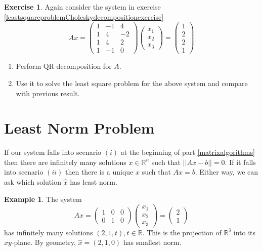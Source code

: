 \documentclass[12pt]{amsart}
\theoremstyle{definition}
\newtheorem{example}[theorem]{Example}
\newtheorem{exercise}[theorem]{Exercise}
\begin{document}
\begin{exercise}\label{} Again consider the system in exercise \ref{leastsquareproblemCholeskydecompositionexercise}
$$Ax = \left(\begin{array}{ccc} 1 & -1 & 4 \\ 1 & 4 & -2 \\ 1 & 4 & 2 \\ 1 & -1 & 0 \end{array}\right)\left(\begin{array}{c} x_1 \\ x_2 \\ x_3 \end{array}\right) = \left(\begin{array}{c}1 \\ 2 \\ 2 \\ 1\end{array}\right)$$
\begin{enumerate}[\indent a.]
\item Perform QR decomposition for $A$.
\item Use it to solve the least square problem for the above system and compare with previous result.
\end{enumerate}
\end{exercise}

\section{Least Norm Problem} If our system falls into scenario $(i)$ at the beginning of part \ref{matrixalgorithms} then there are infinitely many solutions $x \in \mathbb{R}^n$ such that $||Ax - b|| = 0$. If it falls into scenario $(ii)$ then there is a unique $x$ such that $Ax = b$. Either way, we can ask which solution $\hat{x}$ has least norm.

\begin{example}\label{leastnormproblemexample1} The system
$$Ax = \left(\begin{array}{ccc} 1 & 0 & 0 \\ 0 & 1 & 0 \end{array}\right)\left(\begin{array}{c} x_1 \\ x_2 \\ x_3 \end{array}\right) = \left(\begin{array}{c} 2 \\ 1 \end{array}\right)$$
has infinitely many solutions $(2,1, t), t \in \mathbb{R}$. This is the projection of $\mathbb{R}^3$ into its $xy$-plane. By geometry, $\hat{x} = (2,1,0)$ has smallest norm.
\end{example}
\end{document}
